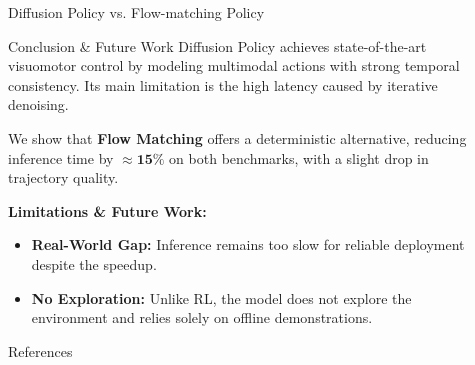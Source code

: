 \documentclass[final]{beamer}
\newlength{\sepwidth}
\newlength{\colwidth}
\newcommand{\separatorcolumn}{\begin{column}{\sepwidth}\end{column}}
\begin{document}
\begin{frame}[t]
\begin{columns}[t]
\begin{column}{\colwidth}
\begin{block}{Diffusion Policy vs. Flow-matching Policy}
  \end{block}
\vspace{-1.4cm}

\begin{block}{Conclusion \& Future Work}
    Diffusion Policy achieves state-of-the-art visuomotor control by modeling multimodal actions with strong temporal consistency. Its main limitation is the high latency caused by iterative denoising.

We show that \textbf{Flow Matching} offers a deterministic alternative, reducing inference time by $\approx \mathbf{15\%}$ on both benchmarks, with a slight drop in trajectory quality.

\textbf{Limitations \& Future Work:}
\begin{itemize}
    \item \textbf{Real-World Gap:} Inference remains too slow for reliable deployment despite the speedup.
    \item \textbf{No Exploration:} Unlike RL, the model does not explore the environment and relies solely on offline demonstrations.
\end{itemize}

  
  \end{block}

\vspace{-1.4cm}
    \begin{block}{References}
    \vspace{-0.2cm}
    \nocite{*}
    \footnotesize{}
    
    \end{block}

\end{column}

\separatorcolumn
\end{columns}
\end{frame}
\end{document}
